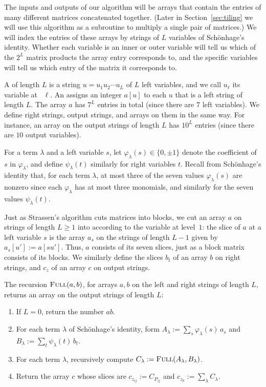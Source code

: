 The inputs and outputs of our algorithm will be arrays that contain the entries of many different matrices concatenated together. (Later in Section~\ref{sec:tiling} we will use this algorithm as a subroutine to multiply a single pair of matrices.) We will index the entries of these arrays by strings of $L$ variables of Sch\"onhage's identity. Whether each variable is an inner or outer variable will tell us which of the $2^L$ matrix products the array entry corresponds to, and the specific variables will tell us which entry of the matrix it corresponds to.

A  of length $L$ is a string $u=u_1u_2\cdots u_L$ of $L$ left variables, and we call $u_\ell$ its variable at ~$\ell$. An  assigns an integer $a[u]$ to each $u$ that is a left string of length $L$. The array $a$ has $7^L$ entries in total (since there are $7$ left variables). We define right strings, output strings, and arrays on them in the same way. For instance, an array on the output strings of length $L$ has $10^L$ entries (since there are $10$ output variables).

For a term $\lambda$ and a left variable $s$, let $\varphi_\lambda(s)\in\{0,\pm1\}$ denote the coefficient of $s$ in $\varphi_\lambda$, and define $\psi_\lambda(t)$ similarly for right variables $t$. Recall from Sch\"onhage's identity that, for each term $\lambda$, at most three of the seven values $\varphi_\lambda(s)$ are nonzero since each $\varphi_\lambda$ has at most three monomials, and similarly for the seven values $\psi_\lambda(t)$.

Just as Strassen's algorithm cuts matrices into blocks, we cut an array $a$ on strings of length $L\ge1$ into  according to the variable at level~$1$: the slice of $a$ at a left variable $s$ is the array $a_s$ on the strings of length $L-1$ given by $a_s[u']:=a[su']$. Thus, $a$ consists of its seven slices, just as a block matrix consists of its blocks. We similarly define the slices $b_t$ of an array $b$ on right strings, and $c_z$ of an array $c$ on output strings.

\smallskip
\noindent\begin{minipage}[t]{\linewidth}
The recursion $\textnormal{\textsc{Full}}(a,b)$, for arrays $a,b$ on the left and right strings of length $L$, returns an array on the output strings of length $L$:
\begin{enumerate}[label=(\arabic*),nosep]
\item If $L=0$, return the number $ab$.
\item For each term $\lambda$ of Sch\"onhage's identity, form $A_\lambda:=\sum_s\varphi_\lambda(s)\,a_s$ and $B_\lambda:=\sum_t\psi_\lambda(t)\,b_t$.
\item For each term $\lambda$, recursively compute $C_\lambda:=\textnormal{\textsc{Full}}(A_\lambda,B_\lambda)$.
\item Return the array $c$ whose slices are $c_{z_{ij}}:=C_{P_{ij}}$ and $c_{z_0}:=\sum_\lambda C_\lambda$.
\end{enumerate}
\end{minipage}
\medskip

